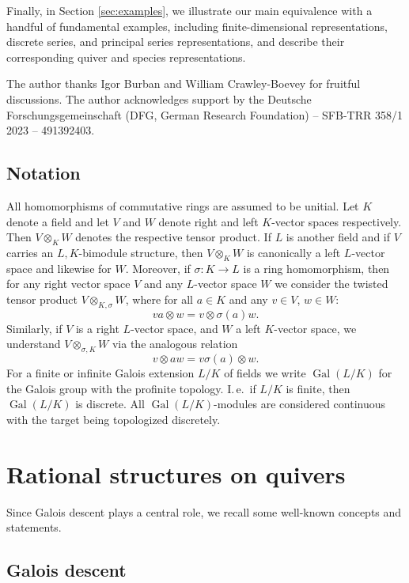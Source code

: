 \documentclass[a4paper,12pt,reqno]{amsart}
\DeclareMathOperator{\Gal}{\mathrm {Gal}}
\theoremstyle{plain}
\theoremstyle{remark}
\begin{document}
    Finally, in Section \ref{sec:examples}, we illustrate our main equivalence with a handful of fundamental examples, including finite-dimensional representations, discrete series, and principal series representations, and describe their corresponding quiver and species representations.

\medskip    
The author thanks Igor Burban and William Crawley-Boevey for fruitful discussions. The author acknowledges support by the Deutsche Forschungsgemeinschaft (DFG, German Research Foundation) -- SFB-TRR 358/1 2023 -- 491392403.



\subsection*{Notation}

All homomorphisms of commutative rings are assumed to be unitial. Let $K$ denote a field and let $V$ and $W$ denote right and left $K$-vector spaces respectively. Then $V\otimes_K W$ denotes the respective tensor product. If $L$ is another field and if $V$ carries an $L,K$-bimodule structure, then $V\otimes_KW$ is canonically a left $L$-vector space and likewise for $W$. Moreover, if $\sigma\colon K\to L$ is a ring homomorphism, then for any right vector space $V$ and any $L$-vector space $W$ we consider the twisted tensor product $V\otimes_{K,\sigma}W$, where for all $a\in K$ and any $v\in V$, $w\in W$:
\[
va\otimes w=v\otimes\sigma(a)w.
\]
Similarly, if $V$ is a right $L$-vector space, and $W$ a left $K$-vector space, we understand $V\otimes_{\sigma,K}W$ via the analogous relation
\[
v\otimes aw=v\sigma(a)\otimes w.
\]
For a finite or infinite Galois extension $L/K$ of fields we write $\Gal(L/K)$ for the Galois group with the profinite topology. I.\,e.\ if $L/K$ is finite, then $\Gal(L/K)$ is discrete. All $\Gal(L/K)$-modules are considered continuous with the target being topologized discretely.

\section{Rational structures on quivers}\label{sec:rationalstructures}

Since Galois descent plays a central role, we recall some well-known concepts and statements.

\subsection{Galois descent}
\end{document}
